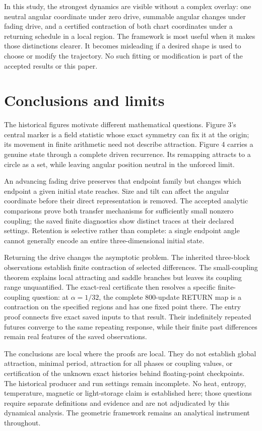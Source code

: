 \documentclass[11pt,a4paper]{article}
\numberwithin{equation}{section}
\begin{document}
In this study, the strongest dynamics are visible without a complex overlay: one neutral angular coordinate under zero drive, summable angular changes under fading drive, and a certified contraction of both chart coordinates under a returning schedule in a local region. The framework is most useful when it makes those distinctions clearer. It becomes misleading if a desired shape is used to choose or modify the trajectory. No such fitting or modification is part of the accepted results or this paper.

\section{Conclusions and limits}\label{sec:conclusion}
The historical figures motivate different mathematical questions. Figure 3's central marker is a field statistic whose exact symmetry can fix it at the origin; its movement in finite arithmetic need not describe attraction. Figure 4 carries a genuine state through a complete driven recurrence. Its remapping attracts to a circle as a set, while leaving angular position neutral in the unforced limit.

An advancing fading drive preserves that endpoint family but changes which endpoint a given initial state reaches. Size and tilt can affect the angular coordinate before their direct representation is removed. The accepted analytic comparisons prove both transfer mechanisms for sufficiently small nonzero coupling; the saved finite diagnostics show distinct traces at their declared settings. Retention is selective rather than complete: a single endpoint angle cannot generally encode an entire three-dimensional initial state.

Returning the drive changes the asymptotic problem. The inherited three-block observations establish finite contraction of selected differences. The small-coupling theorem explains local attracting and saddle branches but leaves its coupling range unquantified. The exact-real certificate then resolves a specific finite-coupling question: at $\alpha=1/32$, the complete 800-update RETURN map is a contraction on the specified regions and has one fixed point there. The entry proof connects five exact saved inputs to that result. Their indefinitely repeated futures converge to the same repeating response, while their finite past differences remain real features of the saved observations.

The conclusions are local where the proofs are local. They do not establish global attraction, minimal period, attraction for all phases or coupling values, or certification of the unknown exact histories behind floating-point checkpoints. The historical producer and run settings remain incomplete. No heat, entropy, temperature, magnetic or light-storage claim is established here; those questions require separate definitions and evidence and are not adjudicated by this dynamical analysis. The geometric framework remains an analytical instrument throughout.
\end{document}

